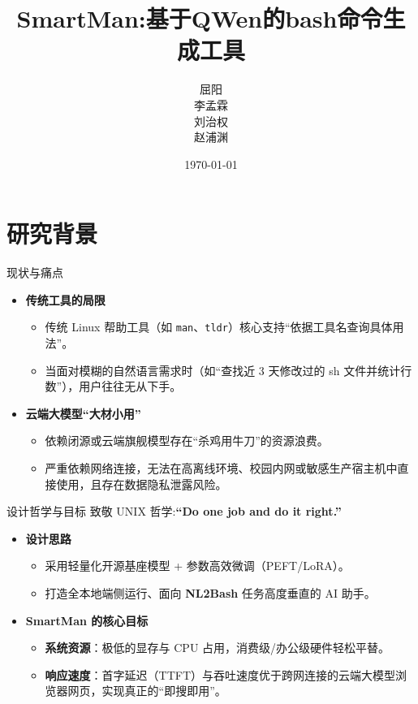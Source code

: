 \documentclass[aspectratio=169]{beamer}
\title{SmartMan:基于QWen的bash命令生成工具}
\author{屈阳\\
李孟霖\\
刘治权\\
赵浦渊}
\date{\today}
\begin{document}
\begin{frame}
  \titlepage
\end{frame}

\section{研究背景}
\begin{frame}[fragile]{现状与痛点}
  \begin{itemize}
    \item \textbf{传统工具的局限}
    \begin{itemize}
      \item 传统 Linux 帮助工具（如 \texttt{man}、\texttt{tldr}）核心支持\alert{“依据工具名查询具体用法”}。
      \item 当面对模糊的自然语言需求时（如“查找近 3 天修改过的 sh 文件并统计行数”），用户往往无从下手。
    \end{itemize}
    \vspace{0.3cm}
    \item \textbf{云端大模型“大材小用”}
    \begin{itemize}
      \item 依赖闭源或云端旗舰模型存在\alert{“杀鸡用牛刀”}的资源浪费。
      \item 严重依赖网络连接，无法在\alert{高离线环境}、\alert{校园内网}或\alert{敏感生产宿主机}中直接使用，且存在数据隐私泄露风险。
    \end{itemize}
  \end{itemize}
\end{frame}

\begin{frame}[fragile]{设计哲学与目标}
  致敬 UNIX 哲学:\textbf{“Do one job and do it right.”}

    \begin{itemize}
    \item \textbf{设计思路}
    \begin{itemize}
      \item 采用\alert{轻量化开源基座模型} + \alert{参数高效微调（PEFT/LoRA）}。
      \item 打造全本地端侧运行、面向 \textbf{NL2Bash} 任务高度垂直的 AI 助手。
    \end{itemize}
    \vspace{0.2cm}
    \item \textbf{SmartMan 的核心目标}
    \begin{itemize}
      \item \textbf{系统资源}：极低的显存与 CPU 占用，消费级/办公级硬件轻松平替。
      \item \textbf{响应速度}：首字延迟（TTFT）与吞吐速度优于跨网连接的云端大模型浏览器网页，实现真正的“即搜即用”。
    \end{itemize}
  \end{itemize}
\end{frame}
\end{document}
